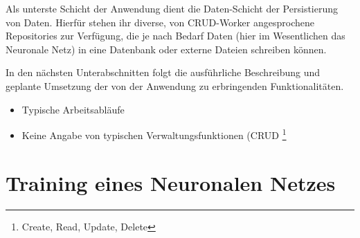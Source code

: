 Als unterste Schicht der Anwendung dient die Daten-Schicht der Persistierung von Daten. Hierfür stehen ihr diverse, von CRUD-Worker angesprochene Repositories zur Verfügung, die je nach Bedarf Daten (hier im Wesentlichen das Neuronale Netz) in eine Datenbank oder externe Dateien schreiben können.

In den nächsten Unterabschnitten folgt die ausführliche Beschreibung und geplante Umsetzung der von der Anwendung zu erbringenden Funktionalitäten.  


\begin{itemize}
  \item Typische Arbeitsabläufe
  \item Keine Angabe von typischen Verwaltungsfunktionen (CRUD \footnote{Create,
Read, Update, Delete}
\end{itemize}


\section{Training eines Neuronalen Netzes}
